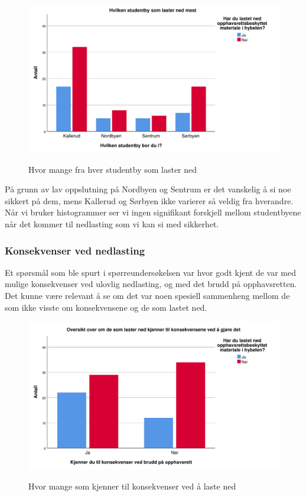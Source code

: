 \begin{figure}[H]
    \centering
    \includegraphics[scale=0.45]{case_1/bilder/studentby_lasterned.pdf}
    \label{fig:studentby_lasterned}
    \caption[Studentby laster ned]{Hvor mange fra hver studentby som laster ned}
\end{figure}

På grunn av lav oppslutning på Nordbyen og Sentrum er det vanskelig å si noe sikkert på dem, mens Kallerud og Sørbyen ikke varierer så veldig fra hverandre. Når vi bruker histogrammer ser vi ingen signifikant forskjell mellom studentbyene når det kommer til nedlasting som vi kan si med sikkerhet.

\subsubsection{Konsekvenser ved nedlasting}
Et spørsmål som ble spurt i spørreundersøkelsen var hvor godt kjent de var med mulige konsekvenser ved ulovlig nedlasting, og med det brudd på opphavsretten. Det kunne være relevant å se om det var noen spesiell sammenheng mellom de som ikke visste om konsekvensene og de som lastet ned. 

\begin{figure}[H]
    \centering
    \includegraphics[scale=0.45]{case_1/bilder/konsekvens_lasterned.pdf}
    \label{fig:konsekvens_lasterned}
    \caption[Konsekvens av å laste ned]{Hvor mange som kjenner til konsekvenser ved å laste ned}
\end{figure}

